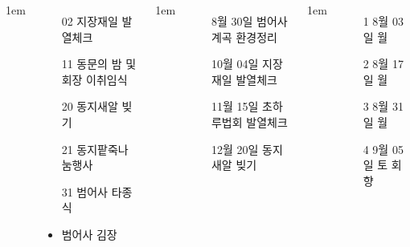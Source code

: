 \documentclass[	17pt, 
							a2paper, 
							portrait, %
							margin=0mm, %
							innermargin=10mm,  		%
							blockverticalspace=4mm, %
							colspace=5mm, 
							subcolspace=0mm
							]{tikzposter}
\begin{document}
\begin{columns}
			{
					\setlength{\leftmargini}{5em}
					\setlength{\labelsep} {1em}
					\begin{itemize}
					\item [02] 	지장재일 발열체크
					\item [11] 	동문의 밤 및 회장 이취임식 
					\item [20] 	동지새알 빚기
					\item [21] 	동지팥죽나눔행사
					\item [31] 	범어사 타종식
					\item 범어사 김장
					\end{itemize}
			}








			{
					\setlength{\leftmargini}{7em}
					\setlength{\labelsep} {1em}
					\begin{itemize}
					\item [ 8월 30일] 범어사 계곡 환경정리
					\item [10월 04일] 지장재일 발열체크
					\item [11월 15일] 초하루법회 발열체크
					\item [12월 20일] 동지 새알 빚기 
					\end{itemize}
			}



			{
					\setlength{\leftmargini}{4em}
					\setlength{\labelsep} {1em}
					\begin{itemize}
					\item [ 1 ] 8월 03일 월
					\item [ 2 ] 8월 17일 월
					\item [ 3 ] 8월 31일 월
					\item [ 4 ] 9월 05일 토 회향
					\end{itemize}
			}



\end{columns}
\end{document}
